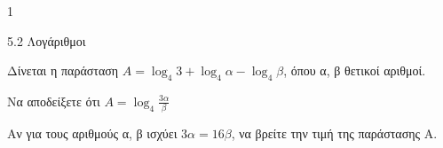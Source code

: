 \begin{ylh}{1}
\item 5.2 Λογάριθμοι
\end{ylh}
Δίνεται η παράσταση $A = \log_4 3 + \log_4 \alpha - \log_4 \beta$, όπου α, β θετικοί αριθμοί.
\begin{alist}
\item Να αποδείξετε ότι $A = \log_4 \frac{3\alpha}{\beta}$
\item Αν για τους αριθμούς α, β ισχύει $3\alpha = 16\beta$, να βρείτε την τιμή της παράστασης Α.
\end{alist}


